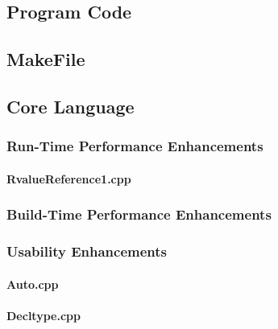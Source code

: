 \documentclass[11pt,]{report}
\newcommand{\Cpp}{\lstset{language=C++,keywordstyle=\bfseries,breaklines,breakindent=30pt}}
\newcommand{\Make}{\lstset{language=make}}
\begin{document}
\begin{appendix}

\chapter{Program Code}
\label{cha:Programcode}


\section{MakeFile}
\label{Makefile}

\Make


\newpage

\section{Core Language}
\label{Appendix: corelanguage}

\Cpp


\subsection{Run-Time Performance Enhancements}
\label{subsection:Run-Time}

\subsubsection{RvalueReference1.cpp}
\label{sub:RvalueReference1.cpp}


\subsection{Build-Time Performance Enhancements}
\label{subsection:Build-Time}

\subsection{Usability Enhancements}
\label{subsection:Usability}

\subsubsection{Auto.cpp}
\label{sub:Auto}


\subsubsection{Decltype.cpp}
\label{sub:Decltype}



\end{appendix}
\end{document}
